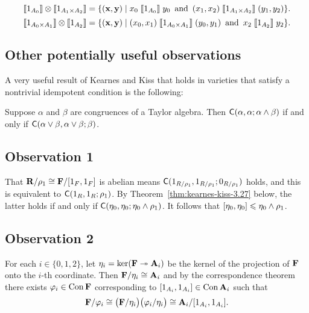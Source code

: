 \medskip

\[
\llbracket 1_{A_0} \rrbracket \otimes \llbracket 1_{A_1\times A_2} \rrbracket = 
\{(\mathbf{x}, \mathbf{y}) \mid x_0 \mathrel{\llbracket 1_{A_0} \rrbracket} y_0 \, \text{ and } \, 
(x_1, x_2) \mathrel{\llbracket 1_{A_1\times A_2} \rrbracket} (y_1, y_2)\}.
\]
\[
\llbracket 1_{A_0\times A_1} \rrbracket \otimes\llbracket 1_{A_2} \rrbracket = 
\{(\mathbf{x}, \mathbf{y}) \mid  
(x_0, x_1) \mathrel{\llbracket 1_{A_0\times A_1} \rrbracket} (y_0, y_1)\, \text{ and } \, x_2 \mathrel{\llbracket 1_{A_2} \rrbracket} y_2 
\}.
\]

\bigskip




\bigskip
\subsection{Other potentially useful observations}
A very useful result of Kearnes and Kiss that holds in varieties that satisfy a
nontrivial idempotent \malcev condition is the following:
\begin{theorem} 
  \label{thm:kearnes-kiss-3.27}
  Suppose $\alpha$ and $\beta$ are congruences of a Taylor algebra. Then
  $\mathsf{C}(\alpha,  \alpha;  \alpha \wedge \beta)$ if and only if
  $\mathsf{C}(\alpha \vee \beta,  \alpha \vee \beta;  \beta)$.
\end{theorem}

\subsection*{Observation 1}
That $\mathbf{R}/\rho_1 \cong \mathbf{F} /[1_{F},1_{F}]$ is abelian means
$\mathsf{C}(1_{R/\rho_1}, 1_{R/\rho_1}; 0_{R/\rho_1})$ holds, and this is equivalent to
$\mathsf{C}(1_R, 1_R; \rho_1)$. By Theorem~\ref{thm:kearnes-kiss-3.27} below, the latter
holds if and only if $\mathsf{C}(\eta_0, \eta_0; \eta_0\wedge \rho_1)$.
It follows that $[\eta_0, \eta_0]\leqslant \eta_0 \wedge \rho_1$.



\subsection*{Observation 2}
\renewcommand{\phi}{\ensuremath{\varphi}}
For each $i\in \{0,1,2\}$, let $\eta_i = \ker(\mathbf{F} \twoheadrightarrow \mathbf{A}_i)$ be the kernel of
the projection of $\mathbf{F}$ onto the $i$-th coordinate.  Then
$\mathbf{F}/\eta_i \cong \mathbf{A}_i$ and by the correspondence theorem there exists
$\phi_i\in \Con\bF$ corresponding to $[1_{A_i}, 1_{A_i}] \in \operatorname{Con} \mathbf{A}_i$
such that 
\[
\bF/\phi_i \cong
\bigl(\bF/\etaR_i\bigr)\bigl(\phi_i/\etaR_i\bigr)
\cong \bA_i/\com{1_{A_i}}.
\]

